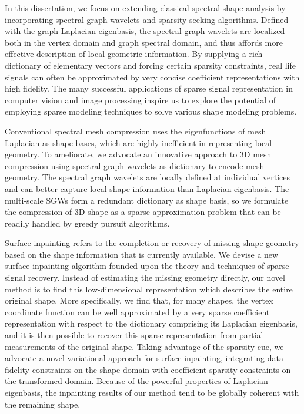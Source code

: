 \documentclass[12pt,letterpaper,twosided]{report}
\numberwithin{equation}{section}
\begin{document}
\onehalfspacing

In this dissertation, we focus on extending classical spectral shape analysis
by incorporating spectral graph wavelets and sparsity-seeking
algorithms. Defined with the graph Laplacian eigenbasis, the spectral graph 
wavelets are localized both in the vertex domain and graph spectral 
domain, and thus affords more effective description of local geometric information. 
By supplying a rich dictionary of elementary vectors and forcing certain sparsity 
constraints, real life signals can often be approximated by very concise coefficient 
representations with high fidelity. The many successful applications of sparse signal 
representation in computer vision and image processing inspire us to explore the 
potential of employing sparse modeling techniques to solve various shape modeling problems.

Conventional spectral mesh compression uses the eigenfunctions of mesh
Laplacian as shape bases, which are highly inefficient in representing local
geometry. To ameliorate, we advocate an innovative approach to 3D mesh
compression using spectral graph wavelets as dictionary to encode mesh geometry.
The spectral graph wavelets are locally defined at individual vertices and can
better capture local shape information than Laplacian eigenbasis. The
multi-scale SGWs form a redundant dictionary as shape basis, so we formulate
the compression of 3D shape as a sparse approximation problem that can be
readily handled by greedy pursuit algorithms.

Surface inpainting refers to the completion or recovery of missing shape
geometry based on the shape information that is currently available. We
devise a new surface inpainting algorithm founded upon the theory and
techniques of sparse signal recovery. Instead of estimating the missing
geometry directly, our novel method is to find this low-dimensional
representation which describes the entire original shape. More specifically,
we find that, for many shapes, the vertex coordinate function can be well
approximated by a very sparse coefficient representation with respect to the
dictionary comprising its Laplacian eigenbasis, and it is then possible to
recover this sparse representation from partial measurements of the original
shape. Taking advantage of the sparsity cue, we advocate a novel variational
approach for surface inpainting, integrating data fidelity constraints on the
shape domain with coefficient sparsity constraints on the transformed domain.
Because of the powerful properties of Laplacian eigenbasis, the inpainting
results of our method tend to be globally coherent with the remaining shape.
\end{document}
